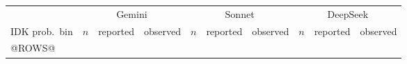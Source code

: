 \begin{tabular}{l*{9}{c}}
\toprule
 & \multicolumn{3}{c}{Gemini} & \multicolumn{3}{c}{Sonnet} & \multicolumn{3}{c}{DeepSeek}\\
\cmidrule(lr){2-4}\cmidrule(lr){5-7}\cmidrule(lr){8-10}
IDK prob.\ bin & $n$ & reported & observed & $n$ & reported & observed & $n$ & reported & observed\\
\midrule
@ROWS@
\bottomrule
\end{tabular}
